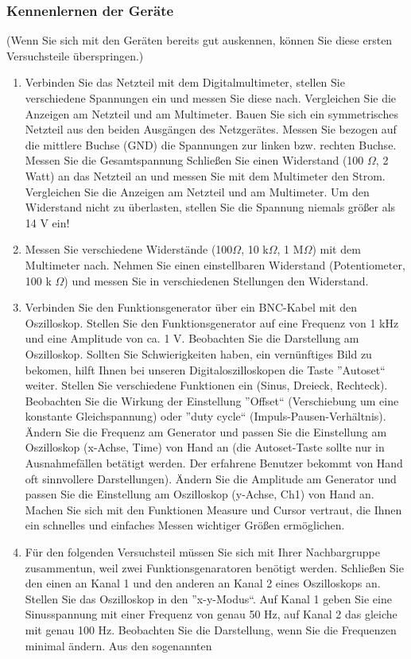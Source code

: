 \documentclass[12pt]{scrartcl}
\begin{document}
\subsubsection{Kennenlernen der Geräte} 
(Wenn Sie sich mit den Geräten bereits gut auskennen, können Sie diese ersten Versuchsteile überspringen.)
\begin{enumerate}
\item
Verbinden Sie das Netzteil mit dem Digitalmultimeter, stellen Sie verschiedene Spannungen ein und messen Sie diese nach. Vergleichen Sie die Anzeigen am Netzteil und am Multimeter. Bauen Sie sich ein symmetrisches Netzteil aus den beiden Ausgängen des Netzgerätes. Messen Sie bezogen auf die mittlere Buchse (GND) die Spannungen zur linken bzw. rechten Buchse. Messen Sie die Gesamtspannung Schließen Sie einen Widerstand (100 $\Omega$, 2 Watt) an das Netzteil an und messen Sie mit dem Multimeter den Strom. Vergleichen Sie die Anzeigen am Netzteil und am Multimeter. Um den Widerstand nicht zu überlasten, stellen Sie die Spannung niemals größer als 14 V ein!
\item
Messen Sie verschiedene Widerstände (100$\Omega$, 10 k$\Omega$, 1 M$\Omega$) mit dem Multimeter nach. Nehmen Sie einen
einstellbaren Widerstand (Potentiometer, 100 k
$\Omega$) und messen Sie in verschiedenen Stellungen den Widerstand.
\item
Verbinden Sie den Funktionsgenerator über ein BNC-Kabel mit den Oszilloskop. Stellen Sie
den Funktionsgenerator auf eine Frequenz von 1 kHz und eine Amplitude von ca. 1 V. Beobachten Sie die Darstellung am Oszilloskop. Sollten Sie Schwierigkeiten haben, ein vernünftiges Bild zu bekomen, hilft Ihnen bei unseren Digitaloszilloskopen die Taste ”Autoset“ weiter. Stellen Sie verschiedene Funktionen ein (Sinus, Dreieck, Rechteck). Beobachten Sie die Wirkung der Einstellung ”Offset“ (Verschiebung um eine konstante Gleichspannung) oder ”duty cycle“ (Impuls-Pausen-Verhältnis). Ändern Sie die Frequenz am Generator und passen Sie die Einstellung am Oszilloskop (x-Achse, Time) von
Hand an (die Autoset-Taste sollte nur in Ausnahmefällen betätigt werden. Der erfahrene Benutzer bekommt von Hand oft sinnvollere Darstellungen). Ändern Sie die Amplitude am Generator und passen Sie die Einstellung am Oszilloskop (y-Achse, Ch1) von Hand an. Machen Sie sich mit den Funktionen Measure und Cursor
vertraut, die Ihnen ein schnelles und einfaches Messen wichtiger Größen ermöglichen.
\item
Für den folgenden Versuchsteil müssen Sie sich mit Ihrer Nachbargruppe zusammentun, weil zwei Funktionsgenaratoren benötigt werden. Schließen Sie den einen an Kanal 1 und den anderen an Kanal 2 eines Oszilloskops an. Stellen Sie das Oszilloskop in den ”x-y-Modus“. Auf Kanal 1 geben Sie eine Sinusspannung mit einer Frequenz von genau 50 Hz, auf Kanal 2 das gleiche mit genau 100 Hz. Beobachten Sie die Darstellung, wenn Sie die Frequenzen minimal ändern. Aus den sogenannten

\end{enumerate}
\end{document}
